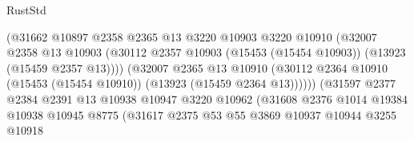\begin{lexlean}{RustStd}
\begin{coremodule}
                                        (@31662
                                          @10897
                                          @2358
                                          @2365
                                          @13
                                          @3220
                                          @10903
                                          @3220
                                          @10910
                                          (@32007
                                            @2358
                                            @13
                                            @10903
                                            (@30112
                                              @2357
                                              @10903
                                              (@15453 (@15454 @10903))
                                              (@13923 (@15459 @2357 @13))))
                                          (@32007
                                            @2365
                                            @13
                                            @10910
                                            (@30112
                                              @2364
                                              @10910
                                              (@15453 (@15454 @10910))
                                              (@13923 (@15459 @2364 @13))))))
                                      (@31597
                                        @2377
                                        @2384
                                        @2391
                                        @13
                                        @10938
                                        @10947
                                        @3220
                                        @10962
                                        (@31608
                                          @2376
                                          @1014
                                          @19384
                                          @10938
                                          @10945
                                          @8775
                                          (@31617
                                            @2375
                                            @53
                                            @55
                                            @3869
                                            @10937
                                            @10944
                                            @3255
                                            @10918

\end{coremodule}
\end{lexlean}
